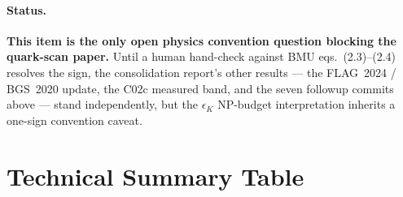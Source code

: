 \documentclass[11pt]{article}
\newcommand{\eK}{\epsilon_K}
\begin{document}
\paragraph{Status.}
\textbf{This item is the only open physics convention question
blocking the quark-scan paper.}  Until a human hand-check against BMU
eqs.~(2.3)--(2.4) resolves the sign, the consolidation report's other
results --- the FLAG~2024 / BGS~2020 update, the C02c measured band,
and the seven followup commits above --- stand independently, but the
$\eK$ NP-budget interpretation inherits a one-sign convention
caveat.


\section{Technical Summary Table}
\label{sec:summary-table}
\end{document}
